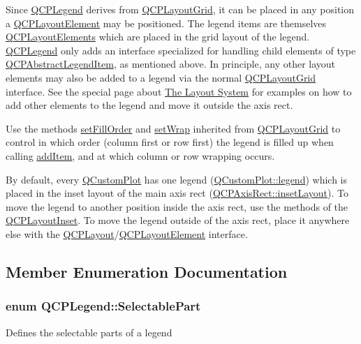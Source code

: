Since \hyperlink{class_q_c_p_legend}{Q\+C\+P\+Legend} derives from \hyperlink{class_q_c_p_layout_grid}{Q\+C\+P\+Layout\+Grid}, it can be placed in any position a \hyperlink{class_q_c_p_layout_element}{Q\+C\+P\+Layout\+Element} may be positioned. The legend items are themselves \hyperlink{class_q_c_p_layout_element}{Q\+C\+P\+Layout\+Elements} which are placed in the grid layout of the legend. \hyperlink{class_q_c_p_legend}{Q\+C\+P\+Legend} only adds an interface specialized for handling child elements of type \hyperlink{class_q_c_p_abstract_legend_item}{Q\+C\+P\+Abstract\+Legend\+Item}, as mentioned above. In principle, any other layout elements may also be added to a legend via the normal \hyperlink{class_q_c_p_layout_grid}{Q\+C\+P\+Layout\+Grid} interface. See the special page about \hyperlink{}{The Layout System} for examples on how to add other elements to the legend and move it outside the axis rect.

Use the methods \hyperlink{class_q_c_p_layout_grid_affc2f3cfd22f28698c5b29b960d2a391}{set\+Fill\+Order} and \hyperlink{class_q_c_p_layout_grid_ab36af18d77e4428386d02970382ee598}{set\+Wrap} inherited from \hyperlink{class_q_c_p_layout_grid}{Q\+C\+P\+Layout\+Grid} to control in which order (column first or row first) the legend is filled up when calling \hyperlink{class_q_c_p_legend_a3ab274de52d2951faea45a6d975e6b3f}{add\+Item}, and at which column or row wrapping occurs.

By default, every \hyperlink{class_q_custom_plot}{Q\+Custom\+Plot} has one legend (\hyperlink{class_q_custom_plot_a4eadcd237dc6a09938b68b16877fa6af}{Q\+Custom\+Plot\+::legend}) which is placed in the inset layout of the main axis rect (\hyperlink{class_q_c_p_axis_rect_a4114887c7141b59650b7488f930993e5}{Q\+C\+P\+Axis\+Rect\+::inset\+Layout}). To move the legend to another position inside the axis rect, use the methods of the \hyperlink{class_q_c_p_layout_inset}{Q\+C\+P\+Layout\+Inset}. To move the legend outside of the axis rect, place it anywhere else with the \hyperlink{class_q_c_p_layout}{Q\+C\+P\+Layout}/\hyperlink{class_q_c_p_layout_element}{Q\+C\+P\+Layout\+Element} interface. 

\subsection{Member Enumeration Documentation}
\subsubsection[{\texorpdfstring{Selectable\+Part}{SelectablePart}}]{\setlength{\rightskip}{0pt plus 5cm}enum {\bf Q\+C\+P\+Legend\+::\+Selectable\+Part}}\hypertarget{class_q_c_p_legend_a5404de8bc1e4a994ca4ae69e2c7072f1}{}\label{class_q_c_p_legend_a5404de8bc1e4a994ca4ae69e2c7072f1}
Defines the selectable parts of a legend

